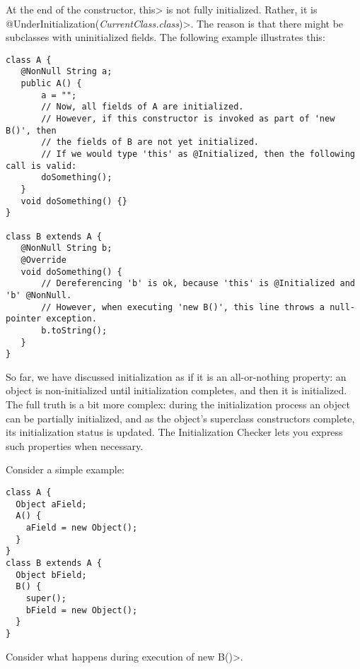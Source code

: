
At the end of the constructor, \<this> is not fully initialized. Rather,
it is \<@UnderInitialization(\emph{CurrentClass.class})>.
The reason is that there might be subclasses with uninitialized fields.
The following example illustrates this:

\begin{Verbatim}
class A {
   @NonNull String a;
   public A() {
       a = "";
       // Now, all fields of A are initialized.
       // However, if this constructor is invoked as part of 'new B()', then
       // the fields of B are not yet initialized.
       // If we would type 'this' as @Initialized, then the following call is valid:
       doSomething();
   }
   void doSomething() {}
}

class B extends A {
   @NonNull String b;
   @Override
   void doSomething() {
       // Dereferencing 'b' is ok, because 'this' is @Initialized and 'b' @NonNull.
       // However, when executing 'new B()', this line throws a null-pointer exception.
       b.toString();
   }
}
\end{Verbatim}



So far, we have discussed initialization as if it is an all-or-nothing property:
an object is non-initialized until initialization completes, and then it is initialized.  The full truth is a bit more complex:  during the
initialization process an object can be partially initialized, and as the
object's superclass constructors complete, its initialization status is updated.  The
Initialization Checker lets you express such properties when necessary.

Consider a simple example:

\begin{Verbatim}
class A {
  Object aField;
  A() {
    aField = new Object();
  }
}
class B extends A {
  Object bField;
  B() {
    super();
    bField = new Object();
  }
}
\end{Verbatim}

Consider what happens during execution of \<new B()>.

